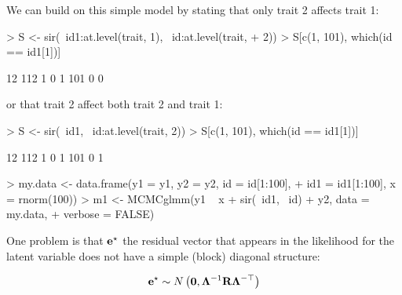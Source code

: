 \documentclass{article}
\begin{document}
We can build on this simple model by stating that only trait 2 affects trait 1:

\begin{Schunk}
\begin{Sinput}
> S <- sir(~id1:at.level(trait, 1), ~id:at.level(trait, 
+     2))
> S[c(1, 101), which(id == id1[1])]
\end{Sinput}
\begin{Soutput}
    12 112
1    0   1
101  0   0
\end{Soutput}
\end{Schunk}

or that trait 2 affect both trait 2 and trait 1:

\begin{Schunk}
\begin{Sinput}
> S <- sir(~id1, ~id:at.level(trait, 2))
> S[c(1, 101), which(id == id1[1])]
\end{Sinput}
\begin{Soutput}
    12 112
1    0   1
101  0   1
\end{Soutput}
\end{Schunk}


\begin{Schunk}
\begin{Sinput}
> my.data <- data.frame(y1 = y1, y2 = y2, id = id[1:100], 
+     id1 = id1[1:100], x = rnorm(100))
> m1 <- MCMCglmm(y1 ~ x + sir(~id1, ~id) + y2, data = my.data, 
+     verbose = FALSE)
\end{Sinput}
\end{Schunk}

One problem is that ${\bf e}^{\star}$ the residual vector that appears in the likelihood for the latent variable does not have a simple (block) diagonal structure:

\begin{equation}
{\bf e}^{\star} \sim N\left({\bm 0}, {\bm \Lambda}^{-1}{\bf R}{\bm \Lambda}^{-\top}\right)
\end{equation}





\ifalone
\end{document}
